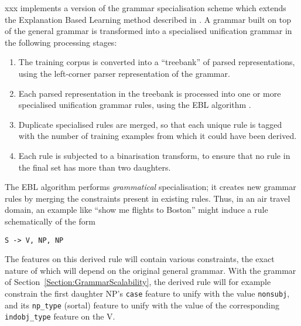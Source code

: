 \documentclass[11pt]{article}
\begin{document}
{\sc xxx} implements a version of the grammar specialisation
scheme which extends the Explanation Based Learning method described
in \cite{RaynerHockeyDowding2002}. A grammar built on top of the
general grammar is transformed into a specialised unification grammar
in the following processing stages:
\begin{enumerate}

\item The training corpus is converted into a ``treebank'' of parsed
representations, using the left-corner parser representation of the
grammar.

\item Each parsed representation in the treebank is processed into one
or more specialised unification grammar rules, using the EBL algorithm
\cite{VanHarmelenBundy88,Rayner88}.

\item Duplicate specialised rules are merged, so that each unique rule is
tagged with the number of training examples from which it could have
been derived. 

%
\item Each rule is subjected to a binarisation transform, to ensure
that no rule in the final set has more than two daughters.

\end{enumerate}

%
The EBL algorithm
performs {\em grammatical} specialisation; it creates new grammar
rules by merging the constraints present in existing rules. Thus, in
an air travel domain, an example like ``show me flights to Boston''
might induce a rule schematically of the form
\begin{verbatim}
S -> V, NP, NP
\end{verbatim}
The features on this derived rule will contain various constraints,
the exact nature of which will depend on the original general grammar.
With the grammar of Section~\ref{Section:GrammarScalability}, 
the derived rule will for example constrain the first daughter NP's
{\tt case} feature to unify with the value {\tt nonsubj}, and its {\tt np\_type}
(sortal) feature to unify with the value of the corresponding
{\tt indobj\_type} feature on the V. 
\end{document}
